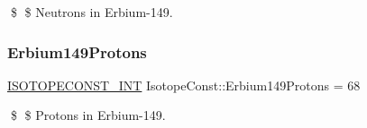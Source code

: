 \$ \$ Neutrons in Erbium-\/149. \mbox{\label{group___isotope_const-_erbium-_er149_gabfb21a83ee35003fc195870f1fa616d0}} 
\subsubsection{\texorpdfstring{Erbium149\+Protons}{Erbium149Protons}}
{\footnotesize\ttfamily \mbox{\hyperlink{group___isotope_const-_macros_ga5f18360b3e99483a35c32d789e62621c}{I\+S\+O\+T\+O\+P\+E\+C\+O\+N\+S\+T\+\_\+\+I\+NT}} Isotope\+Const\+::\+Erbium149\+Protons = 68}

\$ \$ Protons in Erbium-\/149. 